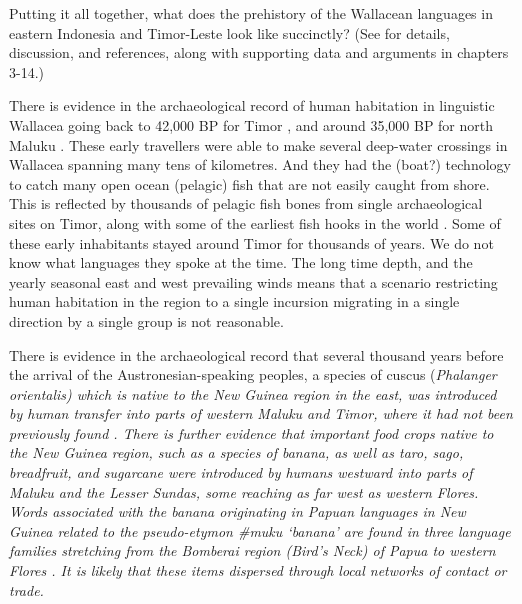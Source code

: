 Putting it all together,
what does the prehistory of the Wallacean languages in eastern
Indonesia and Timor-Leste look like succinctly? (See  for
details, discussion, and references, along with supporting data
and arguments in chapters 3-14.)

There is evidence in the archaeological record of human habitation
in linguistic Wallacea going back to 42,000 BP for Timor \citep{OConnor2015},
and around 35,000 BP for north Maluku \citep{Bellwood2019a}.
These early travellers were able to make several deep-water crossings
in Wallacea spanning many tens of kilometres.
And they had the (boat?) technology to catch many open ocean
(pelagic) fish that are not easily caught from shore.
This is reflected by thousands of pelagic fish bones from single
archaeological sites on Timor,
along with some of the earliest fish hooks in the world \citep{OConnor2015}.
Some of these early inhabitants stayed around Timor for thousands of years.
We do not know what languages they spoke at the time.
The long time depth,
and the yearly seasonal east
and west prevailing winds means that a scenario restricting human
habitation in the region to a single incursion migrating in a
single direction by a single group is not reasonable.

\largerpage
There is evidence in the archaeological record that several thousand
years before the arrival of the Austronesian-speaking peoples,
a species of cuscus (\it{Phalanger orientalis}) which is native
to the New Guinea region in the east,
was introduced by human transfer into parts of western Maluku
and Timor, where it had not been previously found \citep{FlanneryNitihaminoto1995,Schapper2011}.
There is further evidence that important food crops native to
the New Guinea region,
such as a species of banana,
as well as taro,
sago, breadfruit, and sugarcane were introduced by humans westward
into parts of Maluku
and the Lesser Sundas,
some reaching as far west as western Flores.
Words associated with the banana originating in Papuan languages
in New Guinea related to the pseudo-etymon {\#}muku ‘banana’
are found in three language families stretching from the Bomberai
region (Bird’s Neck) of Papua to western Flores
\citep{DenhamDonohue2009,DonohueDenham2009,DonohueDenham2010,UsherSchapper2022}.
It is likely that these items dispersed through local networks
of contact or trade.

